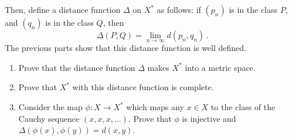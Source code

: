 \documentclass[12pt,letterpaper,reqno]{amsart}
\numberwithin{equation}{section}
\begin{document}
\begin{exercise}
Then, define a distance function $\Delta$
on $X^*$ as follows: if $(p_n)$ is in the class $P$, and $(q_n)$ is in the class $Q$,
then 
$$
\Delta(P,Q) = \lim_{n \to \infty} d(p_n,q_n) \, .
$$
The previous parts show that this distance function is well defined.
\begin{enumerate}[resume]
\item Prove that the distance function $\Delta$ makes $X^*$ into a metric space.
\item Prove that $X^*$ with this distance function is complete.
\item Consider the map $\phi: X \to X^*$
which maps any $x \in X$ to the class
of the Cauchy sequence $(x,x,x,\dots)$.
Prove that $\phi$ is injective and
$\Delta(\phi(x),\phi(y)) = d(x,y)$.
\end{enumerate}

\end{exercise}



\noindent\hrulefill


\end{document}
